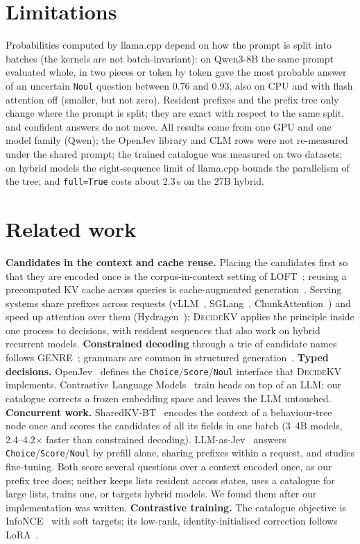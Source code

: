 \documentclass[11pt]{article}
\newcommand{\dkv}{\textsc{DecideKV}}
\begin{document}
\section{Limitations}
Probabilities computed by llama.cpp depend on how the prompt is split into batches (the kernels are not
batch-invariant): on Qwen3-8B the same prompt evaluated whole, in two pieces or token by token gave the most probable
answer of an uncertain \texttt{Noul} question between 0.76 and 0.93, also on CPU and with flash attention off
(smaller, but not zero). Resident prefixes and the prefix tree only change where the prompt is split; they are exact
with respect to the same split, and confident answers do not move. All results come from one GPU and one model family
(Qwen); the OpenJev library and CLM rows were not re-measured under the shared prompt; the trained catalogue was
measured on two datasets; on hybrid models the eight-sequence limit of llama.cpp bounds the parallelism of the tree;
and \texttt{full=True} costs about 2.3\,s on the 27B hybrid.

\section{Related work}\label{sec:related}
\textbf{Candidates in the context and cache reuse.} Placing the candidates first so that they are encoded once is the
corpus-in-context setting of LOFT~\citep{loft}; reusing a precomputed KV cache across queries is cache-augmented
generation~\citep{cag}. Serving systems share prefixes across requests (vLLM~\citep{vllm}, SGLang~\citep{sglang},
ChunkAttention~\citep{chunkattention}) and speed up attention over them (Hydragen~\citep{hydragen}); \dkv{} applies
the principle inside one process to decisions, with resident sequences that also work on hybrid recurrent models.
\textbf{Constrained decoding} through a trie of candidate names follows GENRE~\citep{genre}; grammars are common in
structured generation~\citep{outlines}.
\textbf{Typed decisions.} OpenJev~\citep{openjev} defines the \texttt{Choice}/\texttt{Score}/\texttt{Noul} interface
that \dkv{} implements. Contrastive Language Models~\citep{clm} train heads on top of an LLM; our catalogue corrects a
frozen embedding space and leaves the LLM untouched.
\textbf{Concurrent work.} SharedKV-BT~\citep{sharedkvbt} encodes the context of a behaviour-tree node once and scores
the candidates of all its fields in one batch (3--4B models, 2.4--4.2$\times$ faster than constrained decoding).
LLM-as-Jev~\citep{llmasjev} answers \texttt{Choice}/\texttt{Score}/\texttt{Noul} by prefill alone, sharing prefixes
within a request, and studies fine-tuning. Both score several questions over a context encoded once, as our prefix
tree does; neither keeps lists resident across states, uses a catalogue for large lists, trains one, or targets hybrid
models. We found them after our implementation was written.
\textbf{Contrastive training.} The catalogue objective is InfoNCE~\citep{infonce,clip} with soft targets; its
low-rank, identity-initialised correction follows LoRA~\citep{lora}.
\end{document}
